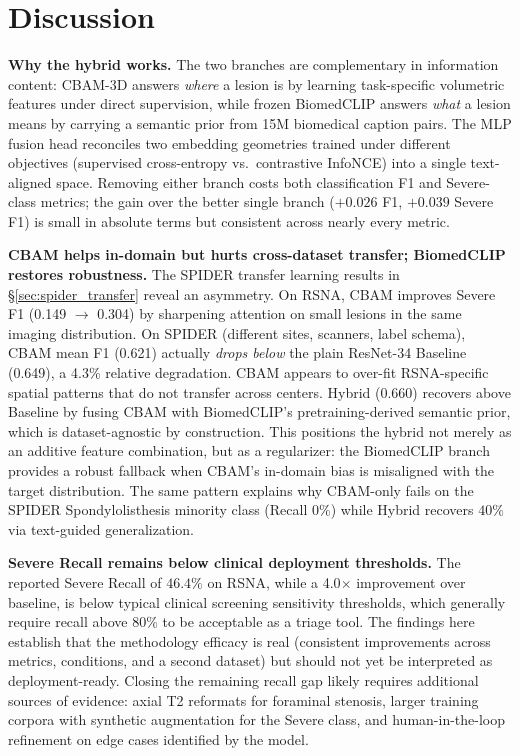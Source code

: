 \documentclass[conference]{IEEEtran}
\begin{document}
\section{Discussion}
\label{sec:disc}

\textbf{Why the hybrid works.} The two branches are complementary in
information content: CBAM-3D answers \emph{where} a lesion is by
learning task-specific volumetric features under direct supervision,
while frozen BiomedCLIP answers \emph{what} a lesion means by carrying
a semantic prior from 15M biomedical caption pairs. The MLP fusion
head reconciles two embedding geometries trained under different
objectives (supervised cross-entropy vs.\ contrastive InfoNCE) into a
single text-aligned space. Removing either branch costs both
classification F1 and Severe-class metrics; the gain over the better
single branch ($+0.026$ F1, $+0.039$ Severe F1) is small in absolute
terms but consistent across nearly every metric.

\textbf{CBAM helps in-domain but hurts cross-dataset transfer; BiomedCLIP
restores robustness.} The SPIDER transfer learning results in
\S\ref{sec:spider_transfer} reveal an asymmetry. On RSNA, CBAM
improves Severe F1 (0.149 $\to$ 0.304) by sharpening attention on
small lesions in the same imaging distribution. On SPIDER (different
sites, scanners, label schema), CBAM mean F1 (0.621) actually
\emph{drops below} the plain ResNet-34 Baseline (0.649), a 4.3\%
relative degradation. CBAM appears to over-fit RSNA-specific spatial
patterns that do not transfer across centers. Hybrid (0.660) recovers
above Baseline by fusing CBAM with BiomedCLIP's pretraining-derived
semantic prior, which is dataset-agnostic by construction. This
positions the hybrid not merely as an additive feature combination,
but as a regularizer: the BiomedCLIP branch provides a robust
fallback when CBAM's in-domain bias is misaligned with the target
distribution. The same pattern explains why CBAM-only fails on the
SPIDER Spondylolisthesis minority class (Recall $0\%$) while Hybrid
recovers $40\%$ via text-guided generalization.

\textbf{Severe Recall remains below clinical deployment thresholds.}
The reported Severe Recall of $46.4\%$ on RSNA, while a 4.0$\times$
improvement over baseline, is below typical clinical screening
sensitivity thresholds, which generally require recall above $80\%$
to be acceptable as a triage tool. The findings here establish that
the methodology efficacy is real (consistent improvements across
metrics, conditions, and a second dataset) but should not yet be
interpreted as deployment-ready. Closing the remaining recall gap
likely requires additional sources of evidence: axial T2 reformats
for foraminal stenosis, larger training corpora with synthetic
augmentation for the Severe class, and human-in-the-loop refinement
on edge cases identified by the model.
\end{document}
